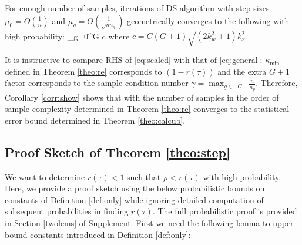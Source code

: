 \begin{corollary}
	\label{corr:show}
	For enough number of samples, iterations of DS algorithm with step sizes $\mu_0 = \Theta(\frac{1}{n})$ and $\mu_g =  \Theta(\frac{1}{\sqrt{n n_g}})$ geometrically converges to the following with high probability:
	{\small\beq
	\label{eq:scaled}
	\sum_{g=0}^{G}  
	\leq c 
	\eeq}
	where $c = C(G+1)\sqrt{(2k_w^2 + 1)k_x^2}$. 
\end{corollary}
	It is instructive to compare RHS of \eqref{eq:scaled} with that of \eqref{eq:general}: $\kappa_{\min}$ defined in Theorem \ref{theo:re} corresponds to $(1 - r(\tau))$ %
	and the extra $G+1$ factor corresponds to the sample condition number $\gamma = \max_{g \in [G] } \frac{n}{n_g}$.
	Therefore, Corollary \ref{corr:show} shows that with the number of samples in the order of sample complexity determined in Theorem \ref{theo:re} \dc{} converges to the statistical error bound determined in Theorem \ref{theo:calcub}.
	
\subsection{Proof Sketch of Theorem \ref{theo:step}}
\label{proofsketch}
	We want to determine $r(\tau) < 1$ such that $\rho < r(\tau)$ with high probability. Here, we provide a proof sketch using the below probabilistic bounds on constants of Definition \ref{def:only} while ignoring detailed computation of subsequent probabilities in finding $r(\tau)$. The full probabilistic proof is provided in Section \ref{twolems} of Supplement. 		
	First we need the following lemma to upper bound constants introduced in Definition \ref{def:only}: 
	
